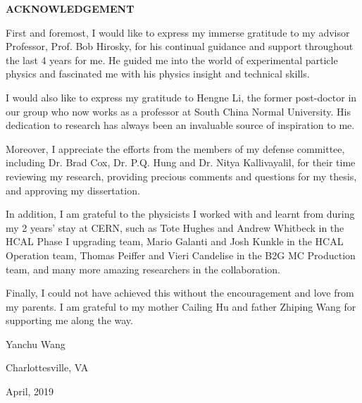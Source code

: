 \begin{center}
\textbf{\huge ACKNOWLEDGEMENT}
\end{center}
\vspace{0.5cm}

First and foremost, I would like to express my immerse gratitude to my advisor Professor, Prof. Bob Hirosky, for his continual guidance and support throughout the last 4 years for me. He guided me into the world of experimental particle physics and fascinated me with his physics insight and technical skills. 

I would also like to express my gratitude to Hengne Li, the former post-doctor in our group who now works as a professor at South China Normal University. His dedication to research has always been an invaluable source of inspiration to me. 

Moreover, I appreciate the efforts from the members of my defense committee, including Dr. Brad Cox, Dr. P.Q. Hung and Dr. Nitya Kallivayalil, for their time reviewing my research, providing precious comments and questions for my thesis, and approving my dissertation.

In addition, I am grateful to the physicists I worked with and learnt from during my 2 years' stay at CERN, such as Tote Hughes and Andrew Whitbeck in the HCAL Phase I upgrading team, Mario Galanti and Josh Kunkle in the HCAL Operation team, Thomas Peiffer and Vieri Candelise in the B2G MC Production team, and many more amazing researchers in the collaboration. 

Finally, I could not have achieved this without the encouragement and love from my parents. I am grateful to my mother Cailing Hu and father Zhiping Wang for supporting me along the way.
\vspace{0.5cm}
\begin{flushleft}
Yanchu Wang

Charlottesville, VA

April, 2019
\end{flushleft}
\newpage
